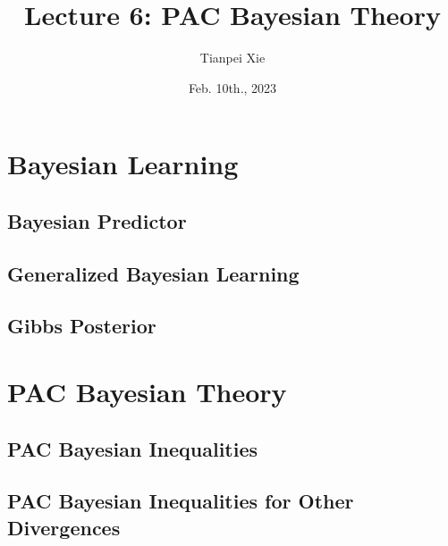 \documentclass[11pt]{article}
\begin{document}
\title{Lecture 6: PAC Bayesian Theory}
\author{ Tianpei Xie}
\date{Feb. 10th., 2023}
\maketitle
\tableofcontents
\newpage
\section{Bayesian Learning}
\subsection{Bayesian Predictor}
\subsection{Generalized Bayesian Learning}
\subsection{Gibbs Posterior}

\section{PAC Bayesian Theory}
\subsection{PAC Bayesian Inequalities}
\subsection{PAC Bayesian Inequalities for Other Divergences}





\newpage


\end{document}
